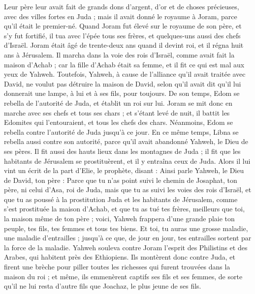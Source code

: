 \begin{multicols}{2}
Leur père leur avait fait de grands dons d'argent, d'or et de choses précieuses, avec des villes fortes en Juda ; mais il avait donné le royaume à Joram, parce qu'il était le premier-né.
Quand Joram fut élevé sur le royaume de son père, et s'y fut fortifié, il tua avec l'épée tous ses frères, et quelques-uns aussi des chefs d'Israël.
Joram était âgé de trente-deux ans quand il devint roi, et il régna huit ans à Jérusalem.
Il marcha dans la voie des rois d'Israël, comme avait fait la maison d'Achab ; car la fille d'Achab était sa femme, et il fit ce qui est mal aux yeux de Yahweh.
Toutefois, Yahweh, à cause de l'alliance qu'il avait traitée avec David, ne voulut pas détruire la maison de David, selon qu'il avait dit qu'il lui donnerait une lampe, à lui et à ses fils, pour toujours.
De son temps, Edom se rebella de l'autorité de Juda, et établit un roi sur lui.
Joram se mit donc en marche avec ses chefs et tous ses chars ; et s'étant levé de nuit, il battit les Edomites qui l'entouraient, et tous les chefs des chars.
Néanmoins, Edom se rebella contre l'autorité de Juda jusqu'à ce jour. En ce même temps, Libna se rebella aussi contre son autorité, parce qu'il avait abandonné Yahweh, le Dieu de ses pères.
Il fit aussi des hauts lieux dans les montagnes de Juda ; il fit que les habitants de Jérusalem se prostituèrent, et il y entraîna ceux de Juda.
Alors il lui vint un écrit de la part d'Elie, le prophète, disant : Ainsi parle Yahweh, le Dieu de David, ton père : Parce que tu n'as point suivi le chemin de Josaphat, ton père, ni celui d'Asa, roi de Juda,
mais que tu as suivi les voies des rois d'Israël, et que tu as poussé à la prostitution Juda et les habitants de Jérusalem, comme s’est prostituée la maison d'Achab, et que tu as tué tes frères, meilleurs que toi, la maison même de ton père ;
voici, Yahweh frappera d’une grande plaie ton peuple, tes fils, tes femmes et tous tes biens.
Et toi, tu auras une grosse maladie, une maladie d'entrailles ; jusqu’à ce que, de jour en jour, tes entrailles sortent par la force de la maladie.
Yahweh souleva contre Joram l'esprit des Philistins et des Arabes, qui habitent près des Ethiopiens.
Ils montèrent donc contre Juda, et firent une brèche pour piller toutes les richesses qui furent trouvées dans la maison du roi ; et même, ils emmenèrent captifs ses fils et ses femmes, de sorte qu'il ne lui resta d’autre fils que Joachaz, le plus jeune de ses fils.

\end{multicols}
